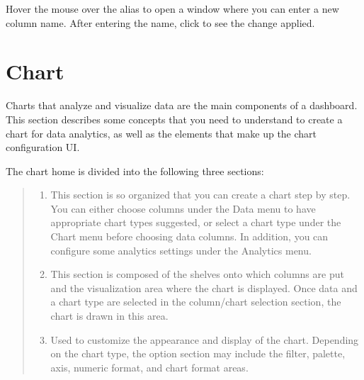 \documentclass[letterpaper,10pt,english]{sphinxmanual}
\begin{document}
Hover the mouse over the alias to open a window where you can enter a new column name. After entering the name, click  to see the change applied.
\begin{quote}

\begin{figure}[H]
\centering

\noindent{}
\end{figure}
\end{quote}


\section{Chart}
\label{\detokenize{discovery/part04/manage_charts:id1}}\label{\detokenize{discovery/part04/manage_charts::doc}}
Charts that analyze and visualize data are the main components of a dashboard. This section describes some concepts that you need to understand to create a chart for data analytics, as well as the elements that make up the chart configuration UI.

The chart home is divided into the following three sections:
\begin{quote}

\begin{figure}[H]
\centering

\noindent{}
\end{figure}
\begin{enumerate}
\def\theenumi{\arabic{enumi}}
\def\labelenumi{\theenumi .}
\makeatletter\def\p@enumii{\p@enumi \theenumi .}\makeatother
\item {} 
 This section is so organized that you can create a chart step by step. You can either choose columns under the Data menu to have appropriate chart types suggested, or select a chart type under the Chart menu before choosing data columns. In addition, you can configure some analytics settings under the Analytics menu.

\item {} 
 This section is composed of the shelves onto which columns are put and the visualization area where the chart is displayed. Once data and a chart type are selected in the column/chart selection section, the chart is drawn in this area.

\item {} 
 Used to customize the appearance and display of the chart. Depending on the chart type, the option section may include the filter, palette, axis, numeric format, and chart format areas.

\end{enumerate}
\end{quote}
\end{document}
